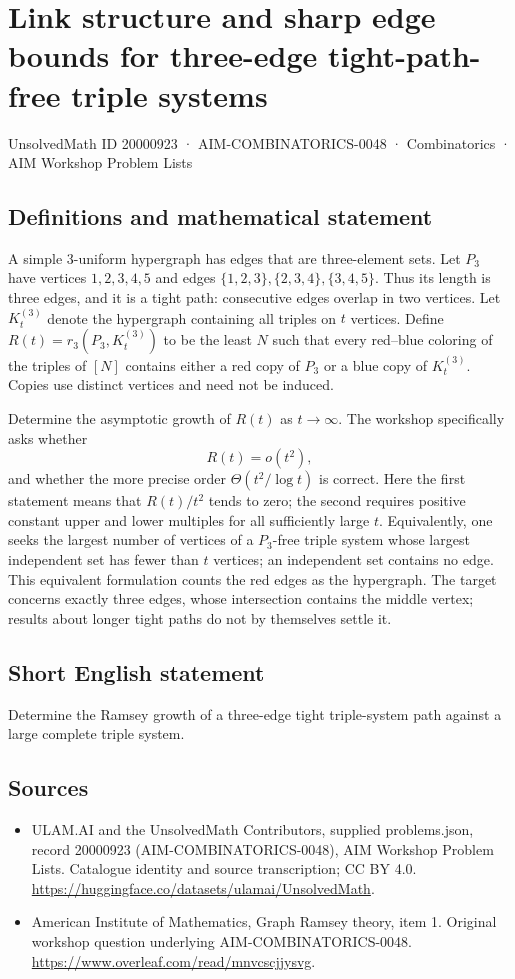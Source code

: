 \documentclass[11pt,a4paper]{article}
\begin{document}
\section*{Link structure and sharp edge bounds for three-edge tight-path-free triple systems}\label{20000923}
{\small UnsolvedMath ID 20000923 · AIM-COMBINATORICS-0048 · Combinatorics · AIM Workshop Problem Lists}
\subsection{Definitions and mathematical statement}
A simple $3$-uniform hypergraph has edges that are three-element sets.
Let $P_3$ have vertices $1,2,3,4,5$ and edges
$\{1,2,3\},\{2,3,4\},\{3,4,5\}$. Thus its length is three edges,
and it is a tight path: consecutive edges overlap in two vertices.
Let $K_t^{(3)}$ denote the hypergraph containing all triples on $t$
vertices. Define $R(t)=r_3(P_3,K_t^{(3)})$ to be the least $N$ such
that every red--blue coloring of the triples of $[N]$ contains either
a red copy of $P_3$ or a blue copy of $K_t^{(3)}$.
Copies use distinct vertices and need not be induced.

Determine the asymptotic growth of $R(t)$ as $t\to\infty$.
The workshop specifically asks whether
\[
                         R(t)=o(t^2),
\]
and whether the more precise order $\Theta(t^2/\log t)$ is correct.
Here the first statement means that $R(t)/t^2$ tends to zero; the
second requires positive constant upper and lower multiples for all
sufficiently large $t$.
Equivalently, one seeks the largest number of vertices of a
$P_3$-free triple system whose largest independent set has fewer than
$t$ vertices; an independent set contains no edge. This equivalent
formulation counts the red edges as the hypergraph. The target concerns
exactly three edges, whose intersection contains the middle vertex;
results about longer tight paths do not by themselves settle it.
\subsection{Short English statement}
Determine the Ramsey growth of a three-edge tight triple-system path against a large complete triple system.
\subsection{Sources}
\begin{itemize}
\item[S1] ULAM.AI and the UnsolvedMath Contributors, supplied problems.json, record 20000923 (AIM-COMBINATORICS-0048), AIM Workshop Problem Lists. Catalogue identity and source transcription; CC BY 4.0.
\url{https://huggingface.co/datasets/ulamai/UnsolvedMath}.
\item[S2] American Institute of Mathematics, Graph Ramsey theory, item 1. Original workshop question underlying AIM-COMBINATORICS-0048.
\url{https://www.overleaf.com/read/mnvcscjjysvg}.
\end{itemize}
\end{document}
